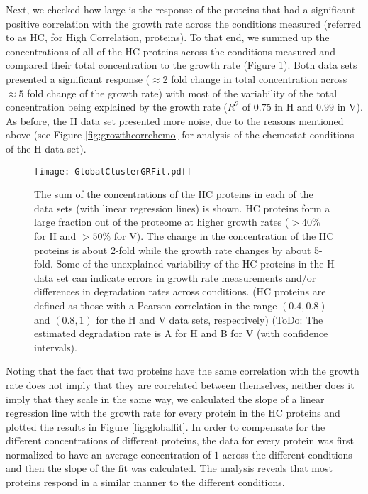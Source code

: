\documentclass[notitlepage]{article}
\begin{document}
Next, we checked how large is the response of the proteins that had a significant positive correlation with the growth rate across the conditions measured (referred to as HC, for High Correlation, proteins).
To that end, we summed up the concentrations of all of the HC-proteins across the conditions measured and compared their total concentration to the growth rate (Figure \ref{fig:globalgrcorr}).
Both data sets presented a significant response ($\approx 2$ fold change in total concentration across $\approx 5$ fold change of the growth rate) with most of the variability of the total concentration being explained by the growth rate ($R^2$ of $0.75$ in H and $0.99$ in V). 
As before, the H data set presented more noise, due to the reasons mentioned above (see Figure \ref{fig:growthcorrchemo} for analysis of the chemostat conditions of the H data set).

\begin{figure}[h]
\centering
\texttt{[image: GlobalClusterGRFit.pdf]}
\caption{
The sum of the concentrations of the HC proteins in each of the data sets (with linear regression lines) is shown.
HC proteins form a large fraction out of the proteome at higher growth rates ($>40\%$ for H and $>50\%$ for V).
The change in the concentration of the HC proteins is about 2-fold while the growth rate changes by about 5-fold.
Some of the unexplained variability of the HC proteins in the H data set can indicate errors in growth rate measurements and/or differences in degradation rates across conditions.
(HC proteins are defined as those with a Pearson correlation in the range $(0.4,0.8)$ and $(0.8,1)$ for the H and V data sets, respectively)
(ToDo: The estimated degradation rate is A for H and B for V (with confidence intervals).
}
\label{fig:globalgrcorr}
\end{figure}

Noting that the fact that two proteins have the same correlation with the growth rate does not imply that they are correlated between themselves, neither does it imply that they scale in the same way, we calculated the slope of a linear regression line with the growth rate for every protein in the HC proteins and plotted the results in Figure \ref{fig:globalfit}.
In order to compensate for the different concentrations of different proteins, the data for every protein was first normalized to have an average concentration of $1$ across the different conditions and then the slope of the fit was calculated.
The analysis reveals that most proteins respond in a similar manner to the different conditions.
\end{document}
